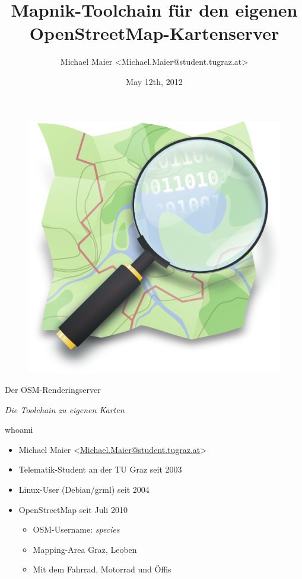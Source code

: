 \documentclass{beamer}
\title{Mapnik-Toolchain für den eigenen OpenStreetMap-Kartenserver}
\author{Michael Maier \textless Michael.Maier@student.tugraz.at\textgreater}
\date{May 12th, 2012}
\begin{document}

\begin{frame} 


\begin{figure}
  \centering
  \includegraphics[width=.5\textwidth]{mag_map.png}
\end{figure}

\begin{center}
\Huge{Der OSM-Renderingserver}
\end{center}

\begin{center}
\Large{\emph{Die Toolchain zu eigenen Karten}}
\end{center}

\end{frame}



\begin{frame}{whoami}

  \begin{itemize}
    \item Michael Maier \textless \href{mailto:Michael.Maier@student.tugraz.at}{Michael.Maier@student.tugraz.at}\textgreater
    \item Telematik-Student an der TU Graz seit 2003
    \item Linux-User (Debian/grml) seit 2004
    \item OpenStreetMap seit Juli 2010
    \begin{itemize}
      \item OSM-Username: \emph{species}
      \item Mapping-Area Graz, Leoben
      \item Mit dem Fahrrad, Motorrad und Öffis
    \end{itemize}
  \end{itemize}
\end{frame}
\end{document}
